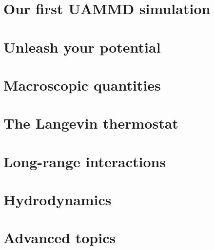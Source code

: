 \documentclass[a4paper,12pt,openany,hidelinks]{book}
\begin{document}
\chapter{Our first UAMMD simulation}



\chapter{Unleash your potential}



\chapter{Macroscopic quantities}

\chapter{The Langevin thermostat}



\chapter{Long-range interactions}

\chapter{Hydrodynamics}

\chapter{Advanced topics}
\end{document}
